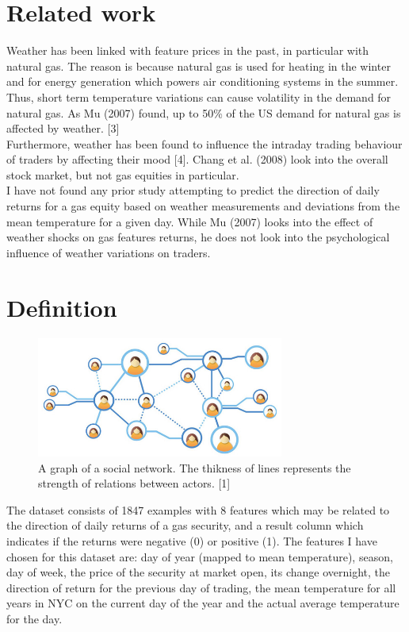 \documentclass[conference,letterpaper]{IEEEtran}
\begin{document}
\section{Related work}
Weather has been linked with feature prices in the past, in particular with natural gas. The reason is because
natural gas is used for heating in the winter and for energy generation which powers air conditioning systems in the summer. 
Thus, short term temperature variations can cause volatility in the demand for natural gas. As Mu (2007) found, up to
50\% of the US demand for natural gas is affected by weather. [3] \\
\indent Furthermore, weather has been found to influence the intraday trading behaviour of traders by affecting their mood [4]. 
Chang et al. (2008) look into the overall stock market, but not gas equities in particular. \\
\indent I have not found any prior study attempting to predict the direction of daily returns for a gas equity based on
weather measurements and deviations from the mean temperature for a given day. While Mu (2007) looks into the effect of
weather shocks on gas features returns, he does not look into the psychological influence of weather variations on traders. \\


\section{Definition}

\begin{center}
\begin{figure}[hb]
\centering
\includegraphics[width=3.2in]{social-network-grid}
\caption{
A graph of a social network. The thikness of lines represents the strength of relations between actors. [1]
}
\label{fig_sim}
\end{figure}
\end{center}

The dataset consists of 1847 examples with 8 features which may be related to the direction of daily returns of a gas security,
and a result column which indicates if the returns were negative (0) or positive (1). The features I have chosen for this dataset 
are: day of year (mapped to mean temperature), season, day of week, the price of the security at market open, its change overnight, 
the direction of return for the previous day of trading, the mean temperature for all years in NYC on the current day of the year
and the actual average temperature for the day.\\
\end{document}
